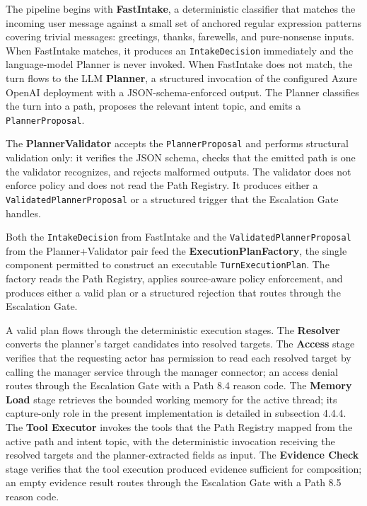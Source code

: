The pipeline begins with \textbf{FastIntake}, a deterministic classifier that matches the incoming user message against a small set of anchored regular expression patterns covering trivial messages: greetings, thanks, farewells, and pure-nonsense inputs. When FastIntake matches, it produces an \texttt{IntakeDecision} immediately and the language-model Planner is never invoked. When FastIntake does not match, the turn flows to the LLM \textbf{Planner}, a structured invocation of the configured Azure OpenAI deployment with a JSON-schema-enforced output. The Planner classifies the turn into a path, proposes the relevant intent topic, and emits a \texttt{PlannerProposal}.

The \textbf{PlannerValidator} accepts the \texttt{PlannerProposal} and performs structural validation only: it verifies the JSON schema, checks that the emitted path is one the validator recognizes, and rejects malformed outputs. The validator does not enforce policy and does not read the Path Registry. It produces either a \texttt{ValidatedPlannerProposal} or a structured trigger that the Escalation Gate handles.

Both the \texttt{IntakeDecision} from FastIntake and the \texttt{ValidatedPlannerProposal} from the Planner+Validator pair feed the \textbf{ExecutionPlanFactory}, the single component permitted to construct an executable \texttt{TurnExecutionPlan}. The factory reads the Path Registry, applies source-aware policy enforcement, and produces either a valid plan or a structured rejection that routes through the Escalation Gate.

A valid plan flows through the deterministic execution stages. The \textbf{Resolver} converts the planner's target candidates into resolved targets. The \textbf{Access} stage verifies that the requesting actor has permission to read each resolved target by calling the manager service through the manager connector; an access denial routes through the Escalation Gate with a Path 8.4 reason code. The \textbf{Memory Load} stage retrieves the bounded working memory for the active thread; its capture-only role in the present implementation is detailed in subsection 4.4.4. The \textbf{Tool Executor} invokes the tools that the Path Registry mapped from the active path and intent topic, with the deterministic invocation receiving the resolved targets and the planner-extracted fields as input. The \textbf{Evidence Check} stage verifies that the tool execution produced evidence sufficient for composition; an empty evidence result routes through the Escalation Gate with a Path 8.5 reason code.

